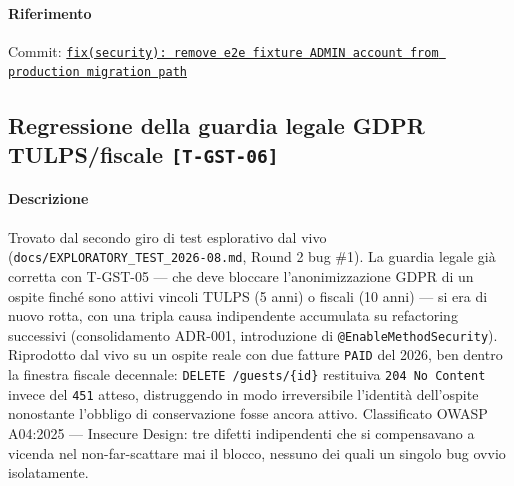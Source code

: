 ﻿\documentclass[a4paper,12pt]{report}
\newcommand{\commitref}[2]{\texttt{\small \href{https://github.com/diegoandruccioli/hotel-pms/commit/#1}{#2}}}
\newcommand{\threat}[1]{\texttt{\small\textcolor{vulnred}{[#1]}}}
\begin{document}
\paragraph{Riferimento} Commit: \commitref{5e7651a2}{fix(security): remove e2e fixture ADMIN account from production migration path}

\subsection{Regressione della guardia legale GDPR TULPS/fiscale \threat{T-GST-06}}

\paragraph{Descrizione}
Trovato dal secondo giro di test esplorativo dal vivo
(\texttt{docs/EXPLORATORY\_TEST\_2026-08.md}, Round 2 bug \#1). La guardia
legale già corretta con T-GST-05 --- che deve bloccare l'anonimizzazione
GDPR di un ospite finché sono attivi vincoli TULPS (5 anni) o fiscali
(10 anni) --- si era di nuovo rotta, con una tripla causa indipendente
accumulata su refactoring successivi (consolidamento ADR-001,
introduzione di \texttt{@EnableMethodSecurity}). Riprodotto dal vivo su
un ospite reale con due fatture \texttt{PAID} del 2026, ben dentro la
finestra fiscale decennale: \texttt{DELETE /guests/\{id\}} restituiva
\texttt{204~No~Content} invece del \texttt{451} atteso, distruggendo in
modo irreversibile l'identità dell'ospite nonostante l'obbligo di
conservazione fosse ancora attivo. Classificato OWASP A04:2025 ---
Insecure Design: tre difetti indipendenti che si compensavano a vicenda
nel non-far-scattare mai il blocco, nessuno dei quali un singolo bug
ovvio isolatamente.
\end{document}
